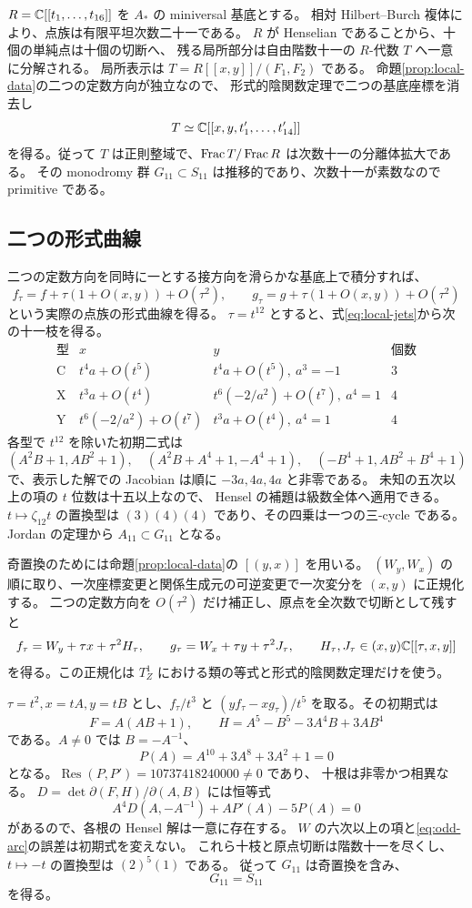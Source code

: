 $R=\mathbb C[[t_1,\ldots,t_{16}]]$ を $A_*$ の miniversal 基底とする。
相対 Hilbert--Burch 複体により、点族は有限平坦次数二十一である。
$R$ が Henselian であることから、十個の単純点は十個の切断へ、
残る局所部分は自由階数十一の $R$-代数 $T$ へ一意に分解される。
局所表示は $T=R[[x,y]]/(F_1,F_2)$ である。
命題\ref{prop:local-data}の二つの定数方向が独立なので、
形式的陰関数定理で二つの基底座標を消去し
\[
 T\simeq\mathbb C[[x,y,t'_1,\ldots,t'_{14}]]
\]
を得る。従って $T$ は正則整域で、$\operatorname{Frac} T/\operatorname{Frac} R$ は次数十一の分離体拡大である。
その monodromy 群 $G_{11}\subset S_{11}$ は推移的であり、次数十一が素数なので primitive である。

\subsection{二つの形式曲線}
二つの定数方向を同時に一とする接方向を滑らかな基底上で積分すれば、
\[
 f_\tau=f+\tau(1+O(x,y))+O(\tau^2),\qquad
 g_\tau=g+\tau(1+O(x,y))+O(\tau^2)
\]
という実際の点族の形式曲線を得る。
$\tau=t^{12}$ とすると、式\eqref{eq:local-jets}から次の十一枝を得る。
\[
\begin{array}{c|c|c|c}
\text{型}&x&y&\text{個数}\\\hline
\mathrm C&t^4a+O(t^5)&t^4a+O(t^5),\ a^3=-1&3\\
\mathrm X&t^3a+O(t^4)&t^6(-2/a^2)+O(t^7),\ a^4=1&4\\
\mathrm Y&t^6(-2/a^2)+O(t^7)&t^3a+O(t^4),\ a^4=1&4
\end{array}
\]
各型で $t^{12}$ を除いた初期二式は
\[
 (A^2B+1,AB^2+1),\quad
 (A^2B+A^4+1,-A^4+1),\quad
 (-B^4+1,AB^2+B^4+1)
\]
で、表示した解での Jacobian は順に $-3a,4a,4a$ と非零である。
未知の五次以上の項の $t$ 位数は十五以上なので、
Hensel の補題は級数全体へ適用できる。
$t\mapsto\zeta_{12}t$ の置換型は $(3)(4)(4)$ であり、その四乗は一つの三-cycle である。
Jordan の定理\cite[Theorem 1.1]{Jones}から $A_{11}\subset G_{11}$ となる。

奇置換のためには命題\ref{prop:local-data}の $[(y,x)]$ を用いる。
$(W_y,W_x)$ の順に取り、一次座標変更と関係生成元の可逆変更で一次変分を $(x,y)$ に正規化する。
二つの定数方向を $O(\tau^2)$ だけ補正し、原点を全次数で切断として残すと
\begin{equation}\label{eq:odd-arc}
 f_\tau=W_y+\tau x+\tau^2H_\tau,\qquad
 g_\tau=W_x+\tau y+\tau^2J_\tau,\qquad
 H_\tau,J_\tau\in(x,y)\mathbb C[[\tau,x,y]]
\end{equation}
を得る。この正規化は $T^1_Z$ における類の等式と形式的陰関数定理だけを使う。

$\tau=t^2,x=tA,y=tB$ とし、$f_\tau/t^3$ と
$(yf_\tau-xg_\tau)/t^5$ を取る。その初期式は
\[
 F=A(AB+1),\qquad H=A^5-B^5-3A^4B+3AB^4
\]
である。$A\ne0$ では $B=-A^{-1}$、
\[
 P(A)=A^{10}+3A^8+3A^2+1=0
\]
となる。$\operatorname{Res}(P,P')=10737418240000\ne0$ であり、
十根は非零かつ相異なる。
$D=\det\partial(F,H)/\partial(A,B)$ には恒等式
\[
 A^4D(A,-A^{-1})+AP'(A)-5P(A)=0
\]
があるので、各根の Hensel 解は一意に存在する。
$W$ の六次以上の項と\eqref{eq:odd-arc}の誤差は初期式を変えない。
これら十枝と原点切断は階数十一を尽くし、$t\mapsto-t$ の置換型は $(2)^5(1)$ である。
従って $G_{11}$ は奇置換を含み、
\begin{equation}\label{eq:local-S11}
 G_{11}=S_{11}
\end{equation}
を得る。

